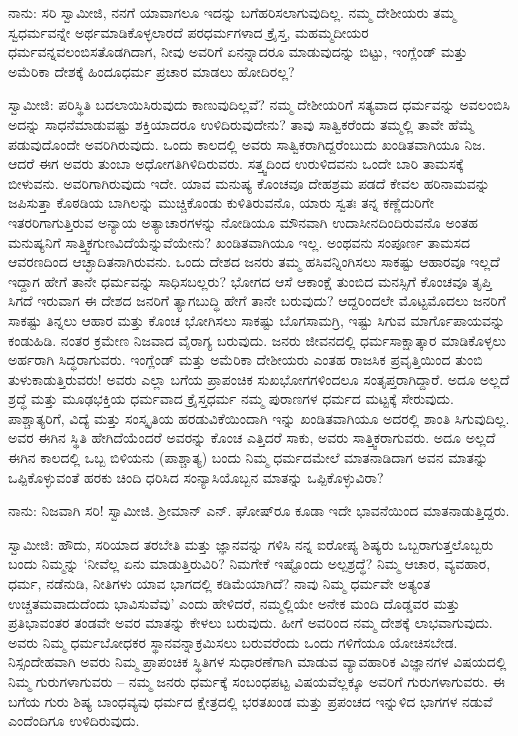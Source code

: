 ನಾನು: ಸರಿ ಸ್ವಾಮೀಜಿ, ನನಗೆ ಯಾವಾಗಲೂ ಇದನ್ನು ಬಗೆಹರಿಸಲಾಗುವುದಿಲ್ಲ. ನಮ್ಮ ದೇಶೀಯರು ತಮ್ಮ ಸ್ವಧರ್ಮವನ್ನೇ ಅರ್ಥಮಾಡಿಕೊಳ್ಳಲಾರದೆ ಪರಧರ್ಮಗಳಾದ ಕ್ರೈಸ್ತ, ಮಹಮ್ಮದೀಯರ ಧರ್ಮವನ್ನವಲಂಬಿಸತೊಡಗಿದಾಗ, ನೀವು ಅವರಿಗೆ ಏನನ್ನಾದರೂ ಮಾಡುವುದನ್ನು ಬಿಟ್ಟು, ಇಂಗ್ಲೆಂಡ್ ಮತ್ತು ಅಮೆರಿಕಾ ದೇಶಕ್ಕೆ ಹಿಂದೂಧರ್ಮ ಪ್ರಚಾರ ಮಾಡಲು ಹೋದಿರಲ್ಲ?

ಸ್ವಾಮೀಜಿ: ಪರಿಸ್ಥಿತಿ ಬದಲಾಯಿಸಿರುವುದು ಕಾಣುವುದಿಲ್ಲವೆ? ನಮ್ಮ ದೇಶೀಯರಿಗೆ ಸತ್ಯವಾದ ಧರ್ಮವನ್ನು ಅವಲಂಬಿಸಿ ಅದನ್ನು ಸಾಧನೆಮಾಡುವಷ್ಟು ಶಕ್ತಿಯಾದರೂ ಉಳಿದಿರುವುದೇನು? ತಾವು ಸಾತ್ವಿಕರೆಂದು ತಮ್ಮಲ್ಲಿ ತಾವೇ ಹೆಮ್ಮೆ ಪಡುವುದೊಂದೇ ಅವರಿಗಿರುವುದು. ಒಂದು ಕಾಲದಲ್ಲಿ ಅವರು ಸಾತ್ವಿಕರಾಗಿದ್ದರೆಂಬುದು ಖಂಡಿತವಾಗಿಯೂ ನಿಜ. ಆದರೆ ಈಗ ಅವರು ತುಂಬಾ ಅಧೋಗತಿಗಿಳಿದಿರುವರು. ಸತ್ತ್ವದಿಂದ ಉರುಳಿದವನು ಒಂದೇ ಬಾರಿ ತಾಮಸಕ್ಕೆ ಬೀಳುವನು. ಅವರಿಗಾಗಿರುವುದು ಇದೇ. ಯಾವ ಮನುಷ್ಯ ಕೊಂಚವೂ ದೇಹಶ್ರಮ ಪಡದೆ ಕೇವಲ ಹರಿನಾಮವನ್ನು ಜಪಿಸುತ್ತಾ ಕೊಠಡಿಯ ಬಾಗಿಲನ್ನು ಮುಚ್ಚಿಕೊಂಡು ಕುಳಿತಿರುವನೊ, ಯಾರು ಸ್ವತಃ ತನ್ನ ಕಣ್ಣೆದುರಿಗೇ ಇತರರಿಗಾಗುತ್ತಿರುವ ಅನ್ಯಾಯ ಅತ್ಯಾಚಾರಗಳನ್ನು ನೋಡಿಯೂ ಮೌನವಾಗಿ ಉದಾಸೀನದಿಂದಿರುವನೊ ಅಂತಹ ಮನುಷ್ಯನಿಗೆ ಸಾತ್ತ್ವಿಕಗುಣವಿದೆಯೆನ್ನುವೆಯೇನು? ಖಂಡಿತವಾಗಿಯೂ ಇಲ್ಲ. ಅಂಥವನು ಸಂಪೂರ್ಣ ತಾಮಸದ ಆವರಣದಿಂದ ಆಚ್ಛಾದಿತನಾಗಿರುವನು. ಒಂದು ದೇಶದ ಜನರು ತಮ್ಮ ಹಸಿವನ್ನಿಂಗಿಸಲು ಸಾಕಷ್ಟು ಆಹಾರವೂ ಇಲ್ಲದೆ ಇದ್ದಾಗ ಹೇಗೆ ತಾನೇ ಧರ್ಮವನ್ನು ಸಾಧಿಸಬಲ್ಲರು? ಭೋಗದ ಆಸೆ ಆಕಾಂಕ್ಷೆ ತುಂಬಿದ ಮನಸ್ಸಿಗೆ ಕೊಂಚವೂ ತೃಪ್ತಿ ಸಿಗದೆ ಇರುವಾಗ ಈ ದೇಶದ ಜನರಿಗೆ ತ್ಯಾಗಬುದ್ಧಿ ಹೇಗೆ ತಾನೇ ಬರುವುದು? ಆದ್ದರಿಂದಲೇ ಮೊಟ್ಟಮೊದಲು ಜನರಿಗೆ ಸಾಕಷ್ಟು ತಿನ್ನಲು ಆಹಾರ ಮತ್ತು ಕೊಂಚ ಭೋಗಿಸಲು ಸಾಕಷ್ಟು ಬೊಗಸಾಮಗ್ರಿ, ಇಷ್ಟು ಸಿಗುವ ಮಾರ್ಗೊಪಾಯವನ್ನು ಕಂಡುಹಿಡಿ. ನಂತರ ಕ್ರಮೇಣ ನಿಜವಾದ ವೈರಾಗ್ಯ ಬರುವುದು. ಜನರು ಜೀವನದಲ್ಲಿ ಧರ್ಮಸಾಕ್ಷಾತ್ಕಾರ ಮಾಡಿಕೊಳ್ಳಲು ಅರ್ಹರಾಗಿ ಸಿದ್ಧರಾಗುವರು. ಇಂಗ್ಲೆಂಡ್ ಮತ್ತು ಅಮೆರಿಕಾ ದೇಶೀಯರು ಎಂತಹ ರಾಜಸಿಕ ಪ್ರವೃತ್ತಿಯಿಂದ ತುಂಬಿ ತುಳುಕಾಡುತ್ತಿರುವರು! ಅವರು ಎಲ್ಲಾ ಬಗೆಯ ಪ್ರಾಪಂಚಿಕ ಸುಖಭೋಗಗಳಿಂದಲೂ ಸಂತೃಪ್ತರಾಗಿದ್ದಾರೆ. ಅದೂ ಅಲ್ಲದೆ ಶ್ರದ್ಧೆ ಮತ್ತು ಮೂಢಭಕ್ತಿಯ ಧರ್ಮವಾದ ಕ್ರೈಸ್ತಧರ್ಮ ನಮ್ಮ ಪುರಾಣಗಳ ಧರ್ಮದ ಮಟ್ಟಕ್ಕೆ ಸೇರುವುದು. ಪಾಶ್ಚಾತ್ಯರಿಗೆ, ವಿದ್ಯೆ ಮತ್ತು ಸಂಸ್ಕೃತಿಯ ಹರಡುವಿಕೆಯಿಂದಾಗಿ ಇನ್ನು ಖಂಡಿತವಾಗಿಯೂ ಅದರಲ್ಲಿ ಶಾಂತಿ ಸಿಗುವುದಿಲ್ಲ. ಅವರ ಈಗಿನ ಸ್ಥಿತಿ ಹೇಗಿದೆಯೆಂದರೆ ಅವರನ್ನು ಕೊಂಚ ಎತ್ತಿದರೆ ಸಾಕು, ಅವರು ಸಾತ್ತ್ವಿಕರಾಗುವರು. ಅದೂ ಅಲ್ಲದೆ ಈಗಿನ ಕಾಲದಲ್ಲಿ ಒಬ್ಬ ಬಿಳಿಯನು (ಪಾಶ್ಚಾತ್ಯ) ಬಂದು ನಿಮ್ಮ ಧರ್ಮದಮೇಲೆ ಮಾತನಾಡಿದಾಗ ಅವನ ಮಾತನ್ನು ಒಪ್ಪಿಕೊಳ್ಳುವಂತೆ ಹರಕು ಚಿಂದಿ ಧರಿಸಿದ ಸಂನ್ಯಾಸಿಯೊಬ್ಬನ ಮಾತನ್ನು ಒಪ್ಪಿಕೊಳ್ಳುವಿರಾ?

ನಾನು: ನಿಜವಾಗಿ ಸರಿ! ಸ್ವಾಮೀಜಿ. ಶ‍್ರೀಮಾನ್ ಎನ್. ಘೋಷ್‌ರೂ ಕೂಡಾ ಇದೇ ಭಾವನೆಯಿಂದ ಮಾತನಾಡುತ್ತಿದ್ದರು.

ಸ್ವಾಮೀಜಿ: ಹೌದು, ಸರಿಯಾದ ತರಬೇತಿ ಮತ್ತು ಜ್ಞಾನವನ್ನು ಗಳಿಸಿ ನನ್ನ ಐರೋಪ್ಯ ಶಿಷ್ಯರು ಒಬ್ಬರಾಗುತ್ತಲೊಬ್ಬರು ಬಂದು ನಿಮ್ಮನ್ನು ‘ನೀವೆಲ್ಲ ಏನು ಮಾಡುತ್ತಿರುವಿರಿ? ನಿಮಗೇಕೆ ಇಷ್ಟೊಂದು ಅಲ್ಪಶ್ರದ್ಧೆ? ನಿಮ್ಮ ಆಚಾರ, ವ್ಯವಹಾರ, ಧರ್ಮ, ನಡೆನುಡಿ, ನೀತಿಗಳು ಯಾವ ಭಾಗದಲ್ಲಿ ಕಡಿಮೆಯಾಗಿದೆ? ನಾವು ನಿಮ್ಮ ಧರ್ಮವೇ ಅತ್ಯಂತ ಉಚ್ಚತಮವಾದುದೆಂದು ಭಾವಿಸುವೆವು’ ಎಂದು ಹೇಳಿದರೆ, ನಮ್ಮಲ್ಲಿಯೇ ಅನೇಕ ಮಂದಿ ದೊಡ್ಡವರ ಮತ್ತು ಪ್ರತಿಭಾವಂತರ ತಂಡವೇ ಅವರ ಮಾತನ್ನು ಕೇಳಲು ಬರುವುದು. ಹೀಗೆ ಅವರಿಂದ ನಮ್ಮ ದೇಶಕ್ಕೆ ಲಾಭವಾಗುವುದು. ಅವರು ನಿಮ್ಮ ಧರ್ಮಬೋಧಕರ ಸ್ಥಾನವನ್ನಾಕ್ರಮಿಸಲು ಬರುವರೆಂದು ಒಂದು ಗಳಿಗೆಯೂ ಯೋಚಿಸಬೇಡ. ನಿಸ್ಸಂದೇಹವಾಗಿ ಅವರು ನಿಮ್ಮ ಪ್ರಾಪಂಚಿಕ ಸ್ಥಿತಿಗಳ ಸುಧಾರಣೆಗಾಗಿ ಮಾಡುವ ವ್ಯಾವಹಾರಿಕ ವಿಜ್ಞಾನಗಳ ವಿಷಯದಲ್ಲಿ ನಿಮ್ಮ ಗುರುಗಳಾಗುವರು – ನಮ್ಮ ಜನರು ಧರ್ಮಕ್ಕೆ ಸಂಬಂಧಪಟ್ಟ ವಿಷಯವೆಲ್ಲಕ್ಕೂ ಅವರಿಗೆ ಗುರುಗಳಾಗುವರು. ಈ ಬಗೆಯ ಗುರು ಶಿಷ್ಯ ಬಾಂಧವ್ಯವು ಧರ್ಮದ ಕ್ಷೇತ್ರದಲ್ಲಿ ಭರತಖಂಡ ಮತ್ತು ಪ್ರಪಂಚದ ಇನ್ನುಳಿದ ಭಾಗಗಳ ನಡುವೆ ಎಂದೆಂದಿಗೂ ಉಳಿದಿರುವುದು.

